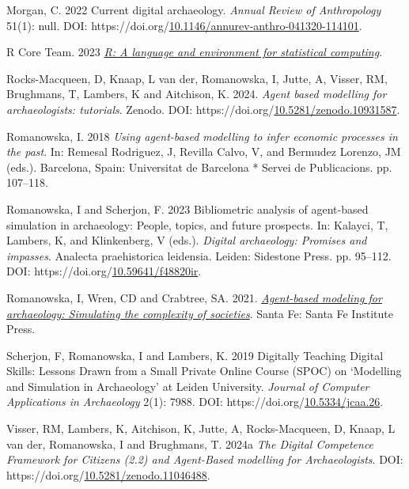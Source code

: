 \documentclass[
]{article}
\newlength{\cslhangindent}
\newlength{\cslentryspacingunit} %
\newenvironment{CSLReferences}[2] %
 {%
  \setlength{\parindent}{0pt}
  \ifodd #1
  \let\oldpar\par
  \def\par{\hangindent=\cslhangindent\oldpar}
  \fi
  \setlength{\parskip}{#2\cslentryspacingunit}
 }%
 {}
\begin{document}
\begin{CSLReferences}{1}{0}
\leavevmode{}%
Morgan, C. 2022 Current digital archaeology. \emph{Annual Review of Anthropology} 51(1): null. DOI: https://doi.org/\href{https://doi.org/10.1146/annurev-anthro-041320-114101}{10.1146/annurev-anthro-041320-114101}.

\leavevmode{}%
R Core Team. 2023 \emph{\href{https://www.R-project.org/}{R: A language and environment for statistical computing}}.

\leavevmode{}%
Rocks-Macqueen, D, Knaap, L van der, Romanowska, I, Jutte, A, Visser, RM, Brughmans, T, Lambers, K and Aitchison, K. 2024. \emph{Agent based modelling for archaeologists: tutorials}. Zenodo. DOI: https://doi.org/\href{https://doi.org/10.5281/zenodo.10931587}{10.5281/zenodo.10931587}.

\leavevmode{}%
Romanowska, I. 2018 \emph{Using agent-based modelling to infer economic processes in the past}. In: Remesal Rodriguez, J, Revilla Calvo, V, and Bermudez Lorenzo, JM (eds.). Barcelona, Spain: Universitat de Barcelona * Servei de Publicacions. pp. 107--118.

\leavevmode{}%
Romanowska, I and Scherjon, F. 2023 Bibliometric analysis of agent-based simulation in archaeology: People, topics, and future prospects. In: Kalayci, T, Lambers, K, and Klinkenberg, V (eds.). \emph{Digital archaeology: Promises and impasses}. Analecta praehistorica leidensia. Leiden: Sidestone Press. pp. 95--112. DOI: https://doi.org/\href{https://doi.org/10.59641/f48820ir}{10.59641/f48820ir}.

\leavevmode{}%
Romanowska, I, Wren, CD and Crabtree, SA. 2021. \emph{\href{https://www.sfipress.org/books/agent-based-modeling-archaeology}{Agent-based modeling for archaeology: Simulating the complexity of societies}}. Santa Fe: Santa Fe Institute Press.

\leavevmode{}%
Scherjon, F, Romanowska, I and Lambers, K. 2019 Digitally Teaching Digital Skills: Lessons Drawn from a Small Private Online Course (SPOC) on {`}Modelling and Simulation in Archaeology{'} at Leiden University. \emph{Journal of Computer Applications in Archaeology} 2(1): 7988. DOI: https://doi.org/\href{https://doi.org/10.5334/jcaa.26}{10.5334/jcaa.26}.

\leavevmode{}%
Visser, RM, Lambers, K, Aitchison, K, Jutte, A, Rocks-Macqueen, D, Knaap, L van der, Romanowska, I and Brughmans, T. 2024a \emph{The Digital Competence Framework for Citizens (2.2) and Agent-Based modelling for Archaeologists}. DOI: https://doi.org/\href{https://doi.org/10.5281/zenodo.11046488}{10.5281/zenodo.11046488}.


\end{CSLReferences}
\end{document}
